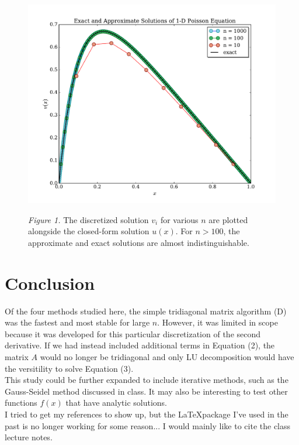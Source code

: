 \documentclass[prb,aps,twocolumn,showpacs,10pt]{revtex4-1}
\begin{document}
\begin{center}
\begin{figure}
\includegraphics[scale=0.7]{compare_simple}

\textit{Figure 1.} The discretized solution $v_i$ for various $n$ are plotted alongside the closed-form solution $u(x)$. For $n>100$, the approximate and exact solutions are almost indistinguishable. 
\end{figure}
\end{center}


\vspace{5 cm}
\section{Conclusion}

Of the four methods studied here, the simple tridiagonal matrix algorithm (D) was the fastest and most stable for large $n$. However, it was limited in scope because it was developed for this particular discretization of the second derivative. If we had instead included additional terms in Equation (2), the matrix $A$ would no longer be tridiagonal and only LU decomposition would have the versitility to solve Equation (3).\\

This study could be further expanded to include iterative methods, such as the Gauss-Seidel method discussed in class. It may also be interesting to test other functions $f(x)$ that have analytic solutions. \\

I tried to get my references to show up, but the \LaTeX package I've used in the past is no longer working for some reason... I would mainly like to cite the class lecture notes.

\newpage

\ \ \ \ \ 
\end{document}
